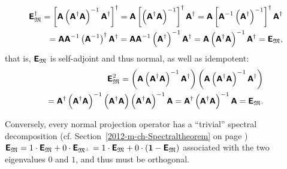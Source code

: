 \begin{equation}
\begin{split}
\textsf{\textbf{E}}_{{\frak M}}^\dagger
=
\left[
\textsf{\textbf{A}}  \left(\textsf{\textbf{A}}^\dagger
\textsf{\textbf{A}} \right)^{-1} \textsf{\textbf{A}}^\dagger
\right]^\dagger
=
\textsf{\textbf{A}} \left[  \left(\textsf{\textbf{A}}^\dagger
\textsf{\textbf{A}} \right)^{-1}\right]^\dagger \textsf{\textbf{A}}^\dagger
=
\textsf{\textbf{A}} \left[ \textsf{\textbf{A}}^{-1}
\left(\textsf{\textbf{A}}^\dagger\right)^{-1} \right]^\dagger \textsf{\textbf{A}}^\dagger \\
=
\textsf{\textbf{A}} \textsf{\textbf{A}}^{-1}
\left(\textsf{\textbf{A}}^{-1}\right)^\dagger  \textsf{\textbf{A}}^\dagger
= \textsf{\textbf{A}} \textsf{\textbf{A}}^{-1}
\left(\textsf{\textbf{A}}^\dagger\right)^{-1}  \textsf{\textbf{A}}^\dagger
= \textsf{\textbf{A}} \left(\textsf{\textbf{A}}^\dagger
\textsf{\textbf{A}}\right)^{-1}  \textsf{\textbf{A}}^\dagger
=  \textsf{\textbf{E}}_{{\frak M}},
\end{split}
\label{2015-m-ch-cfvs-opab6}
\end{equation}
that is, $\textsf{\textbf{E}}_{{\frak M}}$ is self-adjoint and thus normal, as well as idempotent:
\begin{equation}
\begin{split}
\textsf{\textbf{E}}_{{\frak M}}^2
=
\left(
\textsf{\textbf{A}}  \left(\textsf{\textbf{A}}^\dagger
\textsf{\textbf{A}} \right)^{-1} \textsf{\textbf{A}}^\dagger
\right)
\left(
\textsf{\textbf{A}}  \left(\textsf{\textbf{A}}^\dagger
\textsf{\textbf{A}} \right)^{-1} \textsf{\textbf{A}}^\dagger
\right) \\
=
\textsf{\textbf{A}}^\dagger  \left(\textsf{\textbf{A}}^\dagger
\textsf{\textbf{A}} \right)^{-1} \left( \textsf{\textbf{A}}^\dagger
\textsf{\textbf{A}}  \right) \left(\textsf{\textbf{A}} ^\dagger
\textsf{\textbf{A}} \right)^{-1} \textsf{\textbf{A}}
=
\textsf{\textbf{A}}^\dagger   \left(\textsf{\textbf{A}} ^\dagger
\textsf{\textbf{A}} \right)^{-1} \textsf{\textbf{A}}
=
\textsf{\textbf{E}}_{{\frak M}}.
\end{split}
\label{2015-m-ch-cfvs-opab7}
\end{equation}

Conversely, every normal projection operator has a ``trivial'' spectral decomposition
(cf. Section~\ref{2012-m-ch-Spectraltheorem} on page \pageref{2012-m-ch-Spectraltheorem})
$\textsf{\textbf{E}}_{{\frak M}}
=
1 \cdot \textsf{\textbf{E}}_{{\frak M}} + 0 \cdot \textsf{\textbf{E}}_{{\frak M}^\perp}
=
1 \cdot \textsf{\textbf{E}}_{{\frak M}} + 0 \cdot \left(\textbf{1} - \textsf{\textbf{E}}_{{\frak M}}\right)$
associated with the two eigenvalues $0$ and $1$, and thus must be orthogonal.

